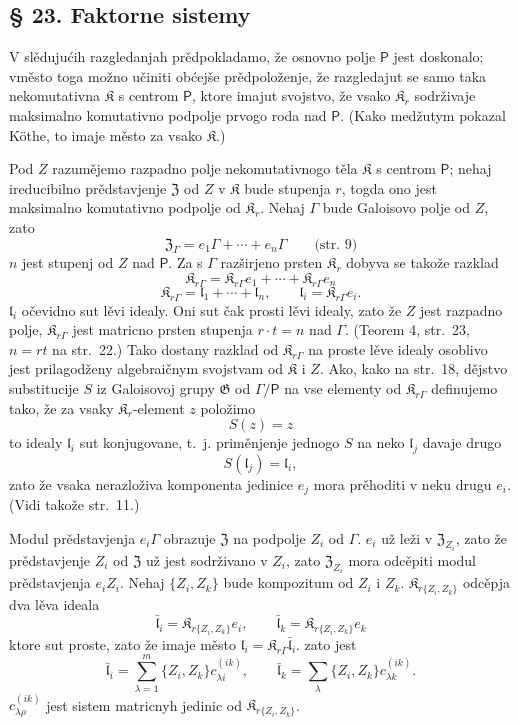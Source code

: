 \documentclass[11pt]{article}
\newcommand{\foreign}[1]{#1}
\begin{document}
\subsection*{§ 23. Faktorne sistemy}\label{faktorensysteme}

V slědujućih razgledanjah prědpokladamo, že osnovno polje \(\mathsf P\) jest doskonalo; vměsto toga možno učiniti obćejše prědpoloženje, že razgledajut se samo taka nekomutativna \(\mathfrak K\) s centrom \(\mathsf P\), ktore imajut svojstvo, že vsako \(\mathfrak K_r\) sodrživaje maksimalno komutativno podpolje prvogo roda nad \(\mathsf P\). (Kako medžutym pokazal \foreign{Köthe}, to imaje město za vsako \(\mathfrak K\).)

Pod \(Z\) razumějemo razpadno polje nekomutativnogo těla \(\mathfrak K\) s centrom \(\mathsf P\); nehaj ireducibilno prědstavjenje \(\mathfrak Z\) od \(Z\) v \(\mathfrak K\) bude stupenja \(r\), togda ono jest maksimalno komutativno podpolje od \(\mathfrak K_r\). Nehaj \(\Gamma\) bude Galoisovo polje od \(Z\), zato
\[
\mathfrak Z_\Gamma=e_1\Gamma+\cdots+e_n\Gamma
\qquad\text{(str.~9)}
\]
\(n\) jest stupenj od \(Z\) nad \(\mathsf P\). Za s \(\Gamma\) razširjeno prsten \(\mathfrak K_r\) dobyva se takože razklad
\[
\mathfrak K_{r\Gamma}=\mathfrak K_{r\Gamma}e_1+\cdots+\mathfrak K_{r\Gamma}e_n
\]
\[
\mathfrak K_{r\Gamma}=\mathfrak l_1+\cdots+\mathfrak l_n,\qquad
\mathfrak l_i=\mathfrak K_{r\Gamma}e_i.
\]
\(\mathfrak l_i\) očevidno sut lěvi idealy. Oni sut čak prosti lěvi idealy, zato že \(Z\) jest razpadno polje, \(\mathfrak K_{r\Gamma}\) jest matricno prsten stupenja \(r\cdot t=n\) nad \(\Gamma\). (Teorem 4, str.~23, \(n=rt\) na str.~22.) Tako dostany razklad od \(\mathfrak K_{r\Gamma}\) na proste lěve idealy osoblivo jest prilagodženy algebraičnym svojstvam od \(\mathfrak K\) i \(Z\). Ako, kako na str.~18, dějstvo substitucije \(S\) iz Galoisovoj grupy \(\mathfrak G\) od \(\Gamma/\mathsf P\) na vse elementy od \(\mathfrak K_{r\Gamma}\) definujemo tako, že za vsaky \(\mathfrak K_r\)-element \(z\) položimo
\[
S(z)=z
\]
to idealy \(\mathfrak l_i\) sut konjugovane, t.~j. priměnjenje jednogo \(S\) na neko \(\mathfrak l_j\) davaje drugo
\[
S(\mathfrak l_j)=\mathfrak l_i,
\]
zato že vsaka nerazloživa komponenta jedinice \(e_j\) mora prěhoditi v neku drugu \(e_i\). (Vidi takože str.~11.)

Modul prědstavjenja \(e_i\Gamma\) obrazuje \(\mathfrak Z\) na podpolje \(Z_i\) od \(\Gamma\). \(e_i\) už leži v \(\mathfrak Z_{Z_i}\), zato že prědstavjenje \(Z_i\) od \(\mathfrak Z\) už jest sodrživano v \(Z_i\), zato \(\mathfrak Z_{Z_i}\) mora odcěpiti modul prědstavjenja \(e_iZ_i\). Nehaj \(\{Z_i,Z_k\}\) bude kompozitum od \(Z_i\) i \(Z_k\). \(\mathfrak K_{r\{Z_i,Z_k\}}\) odcěpja dva lěva ideala
\[
\bar{\mathfrak l}_i=\mathfrak K_{r\{Z_i,Z_k\}}e_i,\qquad
\bar{\mathfrak l}_k=\mathfrak K_{r\{Z_i,Z_k\}}e_k
\]
ktore sut proste, zato že imaje město \(\mathfrak l_i=\mathfrak K_{r\Gamma}\bar{\mathfrak l}_i\). zato jest
\[
\bar{\mathfrak l}_i=\sum_{\lambda=1}^m\{Z_i,Z_k\}c_{\lambda i}^{(ik)},\qquad
\bar{\mathfrak l}_k=\sum_{\lambda}\{Z_i,Z_k\}c_{\lambda k}^{(ik)}.
\]
\(c_{\lambda\rho}^{(ik)}\) jest sistem matricnyh jedinic od \(\mathfrak K_{r\{Z_i,Z_k\}}\).
\end{document}
